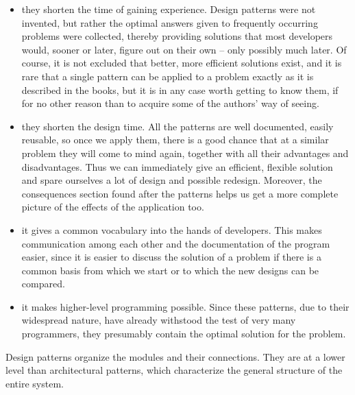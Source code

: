\documentclass[margin=0px]{article}
\begin{document}
\begin{itemize}
    \item they shorten the time of gaining experience. Design patterns were not invented, but rather the optimal answers given to frequently occurring problems were collected, thereby providing solutions that most developers would, sooner or later, figure out on their own -- only possibly much later. Of course, it is not excluded that better, more efficient solutions exist, and it is rare that a single pattern can be applied to a problem exactly as it is described in the books, but it is in any case worth getting to know them, if for no other reason than to acquire some of the authors' way of seeing.
    \item they shorten the design time. All the patterns are well documented, easily reusable, so once we apply them, there is a good chance that at a similar problem they will come to mind again, together with all their advantages and disadvantages. Thus we can immediately give an efficient, flexible solution and spare ourselves a lot of design and possible redesign. Moreover, the consequences section found after the patterns helps us get a more complete picture of the effects of the application too.
    \item it gives a common vocabulary into the hands of developers. This makes communication among each other and the documentation of the program easier, since it is easier to discuss the solution of a problem if there is a common basis from which we start or to which the new designs can be compared.
    \item it makes higher-level programming possible. Since these patterns, due to their widespread nature, have already withstood the test of very many programmers, they presumably contain the optimal solution for the problem.
\end{itemize}

Design patterns organize the modules and their connections. They are at a lower level than architectural patterns, which characterize the general structure of the entire system.
\end{document}

